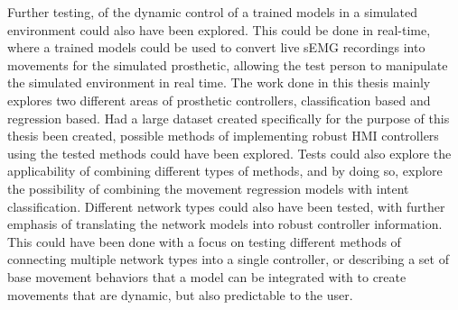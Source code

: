 \documentclass[../main.tex]{subfiles}
\begin{document}
Further testing, of the dynamic control of a trained models in a simulated environment could also have been explored.
This could be done in real-time, where a trained models could be used to convert live \gls{sEMG} recordings into movements for the simulated prosthetic, allowing the test person to manipulate the simulated environment in real time.
The work done in this thesis mainly explores two different areas of prosthetic controllers, classification based and regression based.
Had a large dataset created specifically for the purpose of this thesis been created, possible methods of implementing robust \gls{HMI} controllers using the tested methods could have been explored.
Tests could also explore the applicability of combining different types of methods, and by doing so, explore the possibility of combining the movement regression models with intent classification.  
Different network types could also have been tested, with further emphasis of translating the network models into robust controller information.
This could have been done with a focus on testing different methods of connecting multiple network types into a single controller, or describing a set of base movement behaviors that a model can be integrated with to create movements that are dynamic, but also predictable to the user.  

\end{document}
